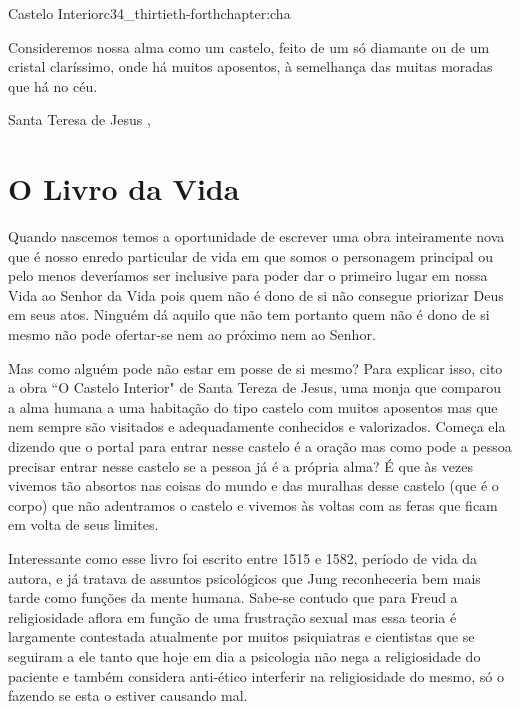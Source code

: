 \begin{chapterpage}{Castelo Interior}{c34_thirtieth-forthchapter:cha}

\begin{myquotation} Consideremos nossa alma como um castelo, feito de um só diamante ou de um cristal claríssimo, onde há muitos aposentos, à semelhança das muitas moradas que há no céu.

\par\vspace*{15mm}
\mbox{}\hfill \emdash{}Santa Teresa de Jesus
, %
\par\end{myquotation}

\end{chapterpage}



\section{O Livro da Vida}\label{c1_basicformatting:sec}

\emdash{}Quando nascemos temos a oportunidade de escrever uma obra inteiramente nova que é nosso enredo particular de vida em que somos o personagem principal ou pelo menos deveríamos ser inclusive para poder dar o primeiro lugar em nossa Vida ao Senhor da Vida pois quem não é dono de si não consegue priorizar Deus em seus atos. Ninguém dá aquilo que não tem portanto quem não é dono de si mesmo não pode ofertar-se nem ao próximo nem ao Senhor.

\emdash{}Mas como alguém pode não estar em posse de si mesmo? Para explicar isso, cito a obra ``O Castelo Interior" de Santa Tereza de Jesus, uma monja que comparou a alma humana a uma habitação do tipo castelo com muitos aposentos mas que nem sempre são visitados e adequadamente conhecidos e valorizados. Começa ela dizendo que o portal para entrar nesse castelo é a oração mas como pode a pessoa precisar entrar nesse castelo se a pessoa já é a própria alma? É que às vezes vivemos tão absortos nas coisas do mundo e das muralhas desse castelo (que é o corpo) que não adentramos o castelo e vivemos às voltas com as feras que ficam em volta de seus limites.

\emdash{}Interessante como esse livro foi escrito entre 1515 e 1582, período de vida da autora, e já tratava de assuntos psicológicos que Jung reconheceria bem mais tarde como funções da mente humana. Sabe-se contudo que para Freud a religiosidade aflora em função de uma frustração sexual mas essa teoria é largamente contestada atualmente por muitos psiquiatras e cientistas que se seguiram a ele tanto que hoje em dia a psicologia não nega a religiosidade do paciente e também considera anti-ético interferir na religiosidade do mesmo, só o fazendo se esta o estiver causando mal.


